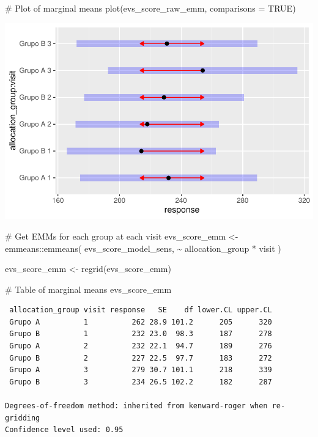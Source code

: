 \documentclass[
  letterpaper,
  DIV=11,
  numbers=noendperiod]{scrartcl}
\newenvironment{Shaded}{\begin{snugshade}}{\end{snugshade}}
\newcommand{\AttributeTok}[1]{\textcolor[rgb]{0.40,0.45,0.13}{#1}}
\newcommand{\CommentTok}[1]{\textcolor[rgb]{0.37,0.37,0.37}{#1}}
\newcommand{\ConstantTok}[1]{\textcolor[rgb]{0.56,0.35,0.01}{#1}}
\newcommand{\FunctionTok}[1]{\textcolor[rgb]{0.28,0.35,0.67}{#1}}
\newcommand{\NormalTok}[1]{\textcolor[rgb]{0.00,0.23,0.31}{#1}}
\newcommand{\OtherTok}[1]{\textcolor[rgb]{0.00,0.23,0.31}{#1}}
\newcommand{\SpecialCharTok}[1]{\textcolor[rgb]{0.37,0.37,0.37}{#1}}
\begin{document}
\begin{Shaded}
\begin{Highlighting}[]
\CommentTok{\# Plot of marginal means}
\FunctionTok{plot}\NormalTok{(evs\_score\_raw\_emm, }\AttributeTok{comparisons =} \ConstantTok{TRUE}\NormalTok{)}
\end{Highlighting}
\end{Shaded}

\includegraphics{Outcomes_V1V2V3_files/figure-pdf/evs_score_raw_emm-1.pdf}

\begin{Shaded}
\begin{Highlighting}[]
\CommentTok{\# Get EMMs for each group at each visit}
\NormalTok{evs\_score\_emm }\OtherTok{\textless{}{-}}\NormalTok{ emmeans}\SpecialCharTok{::}\FunctionTok{emmeans}\NormalTok{(}
\NormalTok{    evs\_score\_model\_sens, }
    \SpecialCharTok{\textasciitilde{}}\NormalTok{ allocation\_group }\SpecialCharTok{*}\NormalTok{ visit}
\NormalTok{)}

\NormalTok{evs\_score\_emm }\OtherTok{\textless{}{-}} \FunctionTok{regrid}\NormalTok{(evs\_score\_emm)}

\CommentTok{\# Table of marginal means}
\NormalTok{evs\_score\_emm}
\end{Highlighting}
\end{Shaded}

\begin{verbatim}
 allocation_group visit response   SE    df lower.CL upper.CL
 Grupo A          1          262 28.9 101.2      205      320
 Grupo B          1          232 23.0  98.3      187      278
 Grupo A          2          232 22.1  94.7      189      276
 Grupo B          2          227 22.5  97.7      183      272
 Grupo A          3          279 30.7 101.1      218      339
 Grupo B          3          234 26.5 102.2      182      287

Degrees-of-freedom method: inherited from kenward-roger when re-gridding 
Confidence level used: 0.95 
\end{verbatim}
\end{document}
